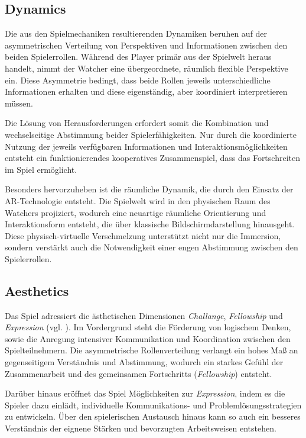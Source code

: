 \subsection{Dynamics}

Die aus den Spielmechaniken resultierenden Dynamiken beruhen auf der asymmetrischen Verteilung von Perspektiven und Informationen zwischen den beiden Spielerrollen. Während des Player primär aus der Spielwelt heraus handelt, nimmt der Watcher eine übergeordnete, räumlich flexible Perspektive ein. Diese Asymmetrie bedingt, dass beide Rollen jeweils unterschiedliche Informationen erhalten und diese eigenständig, aber koordiniert interpretieren müssen.

Die Lösung von Herausforderungen erfordert somit die Kombination und wechselseitige Abstimmung beider Spielerfähigkeiten. Nur durch die koordinierte Nutzung der jeweils verfügbaren Informationen und Interaktionsmöglichkeiten entsteht ein funktionierendes kooperatives Zusammenspiel, dass das Fortschreiten im Spiel ermöglicht.

Besonders hervorzuheben ist die räumliche Dynamik, die durch den Einsatz der \ac{AR}-Technologie entsteht. Die Spielwelt wird in den physischen Raum des Watchers projiziert, wodurch eine neuartige räumliche Orientierung und Interaktionsform entsteht, die über klassische Bildschirmdarstellung hinausgeht. Diese physisch-virtuelle Verschmelzung unterstützt nicht nur die Immersion, sondern verstärkt auch die Notwendigkeit einer engen Abstimmung zwischen den Spielerrollen.

\subsection{Aesthetics}

Das Spiel adressiert die ästhetischen Dimensionen \textit{Challange}, \textit{Fellowship} und \textit{Expression} (vgl. \citealp[S. 3]{hunicke_mda_2004}). Im Vordergrund steht die Förderung von logischem Denken, sowie die Anregung intensiver Kommunikation und Koordination zwischen den Spielteilnehmern. Die asymmetrische Rollenverteilung verlangt ein hohes Maß an gegenseitigem Verständnis und Abstimmung, wodurch ein starkes Gefühl der Zusammenarbeit und des gemeinsamen Fortschritts (\textit{Fellowship}) entsteht.

Darüber hinaus eröffnet das Spiel Möglichkeiten zur \textit{Expression}, indem es die Spieler dazu einlädt, individuelle Kommunikations- und Problemlösungsstrategien zu entwickeln. Über den spielerischen Austausch hinaus kann so auch ein besseres Verständnis der eignene Stärken und bevorzugten Arbeitsweisen entstehen.

